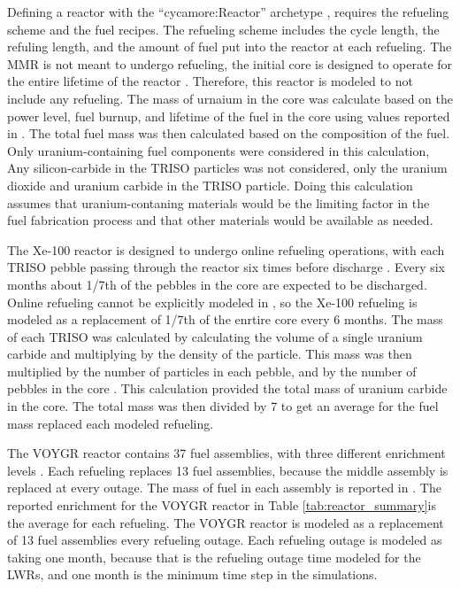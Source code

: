 Defining a reactor with the ``cycamore:Reactor'' archetype \cite{scopatz_cyclus_2015}, 
requires the refueling scheme and the fuel recipes. The refueling scheme includes 
the cycle length, the refuling length, and the amount of fuel put into the reactor 
at each refueling. 
The \gls{MMR} is not meant to undergo refueling, the initial core is designed 
to operate for the entire lifetime of the reactor \cite{mitchell_usnc_2020}. 
Therefore, this reactor 
is modeled to not include any refueling. The mass of urnaium in the core was
calculate based on the power level, fuel burnup, and lifetime of the 
fuel in the core using values reported in \cite{hawari_development_2018}. 
The total fuel mass was then calculated based on the composition of the fuel. 
Only uranium-containing fuel components were considered in this calculation, 
Any silicon-carbide in the \gls{TRISO} particles was not 
considered, only the uranium dioxide and uranium carbide in the \gls{TRISO}
particle. Doing this calculation assumes that uranium-contaning materials would 
be the limiting factor in the fuel fabrication process and that other materials 
would be available as needed. 

The Xe-100 reactor is designed to 
undergo online refueling operations, with each \gls{TRISO} pebble passing 
through the reactor six times before discharge \cite{hussain_advances_2018}. 
Every six months about 1/7th 
of the pebbles in the core are expected to be discharged. Online refueling 
cannot be explicitly modeled in \Cyclus, so the Xe-100 refueling is modeled 
as a replacement of 1/7th of the enrtire core every 6 months. The mass of 
each \gls{TRISO} was calculated by calculating the volume of a single 
uranium carbide \cite{harlan_x-energy_2018} and multiplying by the density of the 
particle. This mass was then multiplied by the number of particles in each 
pebble, and by the number of pebbles in the core \cite{harlan_x-energy_2018}.
This calculation provided the total mass of uranium carbide in the core. The 
total mass was then divided by 7 to get an average for the fuel mass replaced 
each modeled refueling.  

The VOYGR reactor contains 37 fuel assemblies, with three different enrichment 
levels \cite{nuscale_chapter_2020}. Each refueling replaces 13 fuel assemblies, 
because the middle assembly is replaced at every outage. The mass of fuel in 
each assembly is reported in \cite{nuscale_chapter_2020}. The reported enrichment 
for the VOYGR reactor in Table \ref{tab:reactor_summary}is the average for 
each refueling. The VOYGR reactor is 
modeled as a replacement of 13 fuel assemblies every refueling outage. Each refueling 
outage is modeled as taking one month, because that is the refueling outage time 
modeled for the \glspl{LWR}, and one month is the minimum time step in the 
simulations. 

